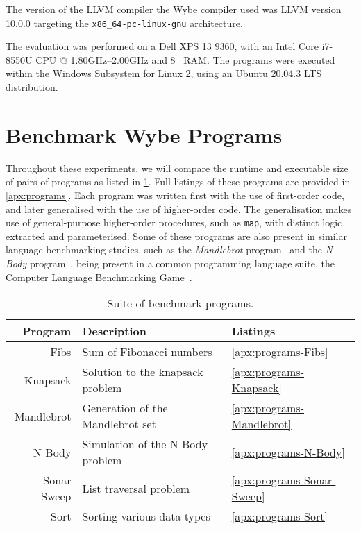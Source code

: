 The version of the LLVM compiler the Wybe compiler used was LLVM version 10.0.0 targeting the \texttt{x86\_64-pc-linux-gnu} architecture.

The evaluation was performed on a Dell XPS\texttrademark{} 13 9360, with an Intel\textregistered{} Core\texttrademark{} i7-8550U CPU @ 1.80\si{\giga\hertz}--2.00\si{\giga\hertz} and 8\si{\giga\byte} RAM. The programs were executed within the Windows Subsystem for Linux 2, using an Ubuntu\texttrademark{} 20.04.3 LTS distribution. 

\section{Benchmark Wybe Programs}
\label{sec:analysed-programs}

Throughout these experiments, we will compare the runtime and executable size of pairs of programs as listed in \cref{tab:prog-suite}. Full listings of these programs are provided in \cref{apx:programs}. Each program was written first with the use of first-order code, and later generalised with the use of higher-order code. The generalisation makes use of general-purpose higher-order procedures, such as \texttt{map}, with distinct logic extracted and parameterised. Some of these programs are also present in similar language benchmarking studies, such as the \textit{Mandlebrot} program~\cite{leissa2015graph, marr2016cross, huseinovic2015benchmark} and the \textit{N Body} program~\cite{leissa2015graph, marr2016cross, pestov2010factor}, being present in a common programming language suite, the Computer Language Benchmarking Game~\cite{guoy2008computer}. 

\begin{table}[ht]
  \centering
  \begin{tabular}{rll}
    \toprule
    Program & Description & Listings \\
    \midrule
    Fibs        & Sum of Fibonacci numbers         & \cref{apx:programs-Fibs} \\
    Knapsack    & Solution to the knapsack problem & \cref{apx:programs-Knapsack} \\
    Mandlebrot  & Generation of the Mandlebrot set & \cref{apx:programs-Mandlebrot} \\
    N Body      & Simulation of the N Body problem & \cref{apx:programs-N-Body} \\
    Sonar Sweep & List traversal problem           & \cref{apx:programs-Sonar-Sweep} \\
    Sort        & Sorting various data types       & \cref{apx:programs-Sort} \\
    \midrule
  \end{tabular}
  \caption{Suite of benchmark programs.}
  \label{tab:prog-suite}
\end{table}

